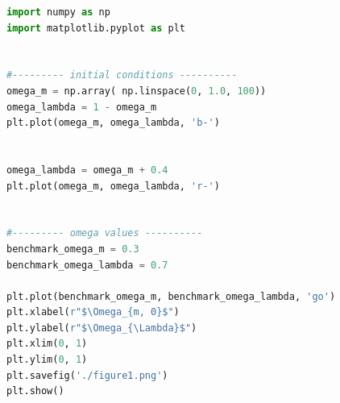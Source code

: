 \documentclass[12pt]{article}
\begin{document}
\begin{lstlisting}[language=Python, caption= Problem 8.2 plotting code]
import numpy as np
import matplotlib.pyplot as plt


#--------- initial conditions ----------
omega_m = np.array( np.linspace(0, 1.0, 100))
omega_lambda = 1 - omega_m
plt.plot(omega_m, omega_lambda, 'b-')


omega_lambda = omega_m + 0.4
plt.plot(omega_m, omega_lambda, 'r-')


#--------- omega values ----------
benchmark_omega_m = 0.3
benchmark_omega_lambda = 0.7

plt.plot(benchmark_omega_m, benchmark_omega_lambda, 'go')
plt.xlabel(r"$\Omega_{m, 0}$")
plt.ylabel(r"$\Omega_{\Lambda}$")
plt.xlim(0, 1)
plt.ylim(0, 1)
plt.savefig('./figure1.png')
plt.show()
\end{lstlisting}


 
\end{document}

